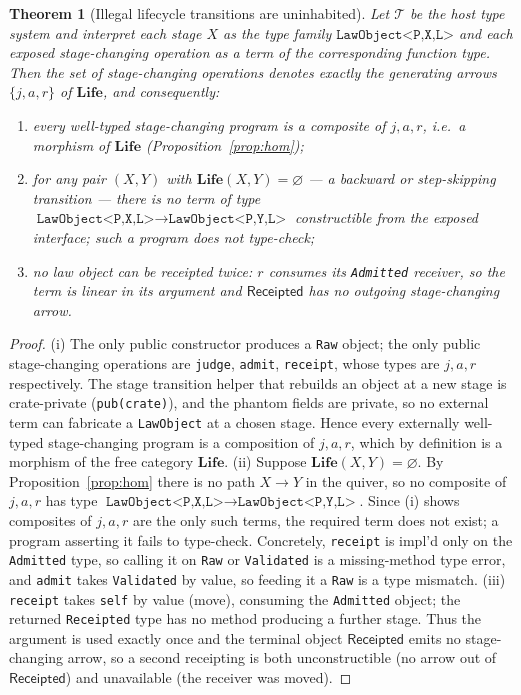 \documentclass[11pt,oneside]{book}
\theoremstyle{definition}
\theoremstyle{plain}
\newtheorem{theorem}{Theorem}[chapter]
\theoremstyle{remark}
\newcommand{\Rcpt}{\mathsf{Receipted}}
\newcommand{\Life}{\mathbf{Life}}
\newcommand{\code}[1]{\texttt{#1}}
\begin{document}
\begin{theorem}[Illegal lifecycle transitions are uninhabited]\label{thm:typestate}
Let $\mathcal{T}$ be the host type system and interpret each stage $X$ as the type family
$\code{LawObject<P,X,L>}$ and each exposed stage-changing operation as a term of the
corresponding function type. Then the set of stage-changing operations denotes exactly the
generating arrows $\{j,a,r\}$ of $\Life$, and consequently:
\begin{enumerate}[label=(\roman*),leftmargin=*]
  \item every well-typed stage-changing program is a composite of $j,a,r$, i.e.\ a morphism
        of $\Life$ (Proposition~\ref{prop:hom});
  \item for any pair $(X,Y)$ with $\Life(X,Y)=\varnothing$ --- a backward or step-skipping
        transition --- there is no term of type $\code{LawObject<P,X,L>}\to\code{LawObject<P,Y,L>}$
        constructible from the exposed interface; such a program does not type-check;
  \item no law object can be receipted twice: $r$ consumes its \code{Admitted} receiver, so
        the term is linear in its argument and $\Rcpt$ has no outgoing stage-changing arrow.
\end{enumerate}
\end{theorem}

\begin{proof}
(i) The only public constructor produces a \code{Raw} object; the only public stage-changing
operations are \code{judge}, \code{admit}, \code{receipt}, whose types are $j,a,r$
respectively. The stage transition helper that rebuilds an object at a new stage is
crate-private (\code{pub(crate)}), and the phantom fields are private, so no external term
can fabricate a \code{LawObject} at a chosen stage. Hence every externally well-typed
stage-changing program is a composition of $j,a,r$, which by definition is a morphism of the
free category $\Life$.
(ii) Suppose $\Life(X,Y)=\varnothing$. By Proposition~\ref{prop:hom} there is no path
$X\to Y$ in the quiver, so no composite of $j,a,r$ has type
$\code{LawObject<P,X,L>}\to\code{LawObject<P,Y,L>}$. Since (i) shows composites of $j,a,r$
are the only such terms, the required term does not exist; a program asserting it fails to
type-check. Concretely, \code{receipt} is impl'd only on the \code{Admitted} type, so calling
it on \code{Raw} or \code{Validated} is a missing-method type error, and \code{admit} takes
\code{Validated} by value, so feeding it a \code{Raw} is a type mismatch.
(iii) \code{receipt} takes \code{self} by value (move), consuming the \code{Admitted} object;
the returned \code{Receipted} type has no method producing a further stage. Thus the argument
is used exactly once and the terminal object $\Rcpt$ emits no stage-changing arrow, so a
second receipting is both unconstructible (no arrow out of $\Rcpt$) and unavailable (the
receiver was moved). \end{proof}
\end{document}
